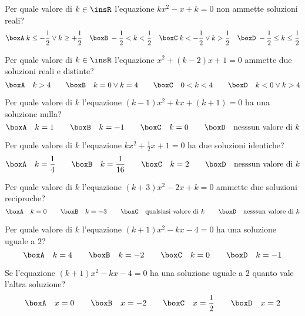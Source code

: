 \begin{esercizio}
 \label{ese:3.105}
 Per quale valore di $k \in \insR$ l'equazione $kx^{2}-x + k = 0$ non ammette soluzioni reali?
\[\boxA\; k \leq-\frac{1}{2} \vee k \geq + \frac{1}{2}\quad\boxB\; - \frac{1}{2} < k < \frac{1}{2}\quad\boxC\; k <-\frac{1}{2} \vee k > \frac{1}{2}\quad\boxD\; - \frac{1}{2} \leq k \leq \frac{1}{2}\]
\end{esercizio}

\begin{esercizio}
 \label{ese:3.106}
Per quale valore di $k \in \insR$ l'equazione $x^{2} + (k-2) x + 1 = 0$ ammette due soluzioni reali e distinte?
\[\boxA\quad k > 4\qquad\boxB\quad k = 0 \vee k = 4\qquad\boxC\quad 0 < k < 4\qquad\boxD\quad k < 0 \vee k > 4\]
\end{esercizio}

\begin{esercizio}
 \label{ese:3.107}
Per quale valore di $k$ l'equazione $(k-1) x^{2} + kx + (k + 1) = 0$ ha una soluzione nulla?
\[\boxA\quad k = 1\qquad\boxB\quad k = -1\qquad\boxC\quad k =0\qquad\boxD\quad \text{nesssun valore di }k\]
\end{esercizio}

\begin{esercizio}
 \label{ese:3.108}
Per quale valore di $k$ l'equazione $kx^{2} + \frac{1}{2} x + 1 = 0$ ha due soluzioni identiche?
\[\boxA\quad k = \frac{1}{4}\qquad\boxB\quad k = \frac{1}{16}\qquad\boxC\quad k = 2\qquad\boxD\quad \text{nesssun valore di }k\]
\end{esercizio}

\begin{esercizio}
 \label{ese:3.109}
Per quale valore di $k$ l'equazione $(k + 3) x^{2}-2x + k = 0$ ammette due soluzioni reciproche?
\[\boxA\quad k = 0\qquad\boxB\quad k = -3\qquad\boxC\quad \text{qualsiasi valore di }k\qquad\boxD\quad \text{nesssun valore di }k\]
\end{esercizio}

\begin{esercizio}
 \label{ese:3.110}
Per quale valore di $k$ l'equazione $(k + 1) x^{2}-kx-4 = 0$ ha una soluzione uguale a $2$?
\[\boxA\quad k = 4\qquad\boxB\quad k =-2\qquad\boxC\quad k = 0\qquad\boxD\quad k =-1\]
\end{esercizio}

\begin{esercizio}
 \label{ese:3.111}
Se l'equazione $(k + 1) x^{2}-kx-4 = 0$ ha una soluzione uguale a $2$ quanto vale l'altra soluzione?
\[\boxA\quad x = 0\qquad\boxB\quad x =-2\qquad\boxC\quad x = \frac{1}{2}\qquad\boxD\quad x = 2\]
\end{esercizio}

